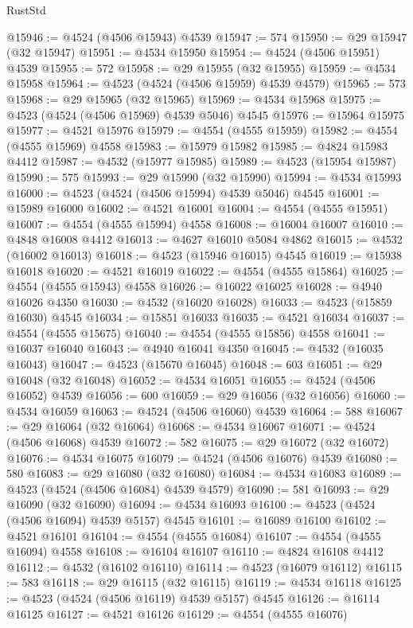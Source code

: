 \begin{lexlean}{RustStd}
\begin{coremodule}
@15946 := @4524 (@4506 @15943) @4539
@15947 := 574
@15950 := @29 @15947 (@32 @15947)
@15951 := @4534 @15950
@15954 := @4524 (@4506 @15951) @4539
@15955 := 572
@15958 := @29 @15955 (@32 @15955)
@15959 := @4534 @15958
@15964 := @4523 (@4524 (@4506 @15959) @4539 @4579)
@15965 := 573
@15968 := @29 @15965 (@32 @15965)
@15969 := @4534 @15968
@15975 := @4523 (@4524 (@4506 @15969) @4539 @5046) @4545
@15976 := @15964 @15975
@15977 := @4521 @15976
@15979 := @4554 (@4555 @15959)
@15982 := @4554 (@4555 @15969) @4558
@15983 := @15979 @15982
@15985 := @4824 @15983 @4412
@15987 := @4532 (@15977 @15985)
@15989 := @4523 (@15954 @15987)
@15990 := 575
@15993 := @29 @15990 (@32 @15990)
@15994 := @4534 @15993
@16000 := @4523 (@4524 (@4506 @15994) @4539 @5046) @4545
@16001 := @15989 @16000
@16002 := @4521 @16001
@16004 := @4554 (@4555 @15951)
@16007 := @4554 (@4555 @15994) @4558
@16008 := @16004 @16007
@16010 := @4848 @16008 @4412
@16013 := @4627 @16010 @5084 @4862
@16015 := @4532 (@16002 @16013)
@16018 := @4523 (@15946 @16015) @4545
@16019 := @15938 @16018
@16020 := @4521 @16019
@16022 := @4554 (@4555 @15864)
@16025 := @4554 (@4555 @15943) @4558
@16026 := @16022 @16025
@16028 := @4940 @16026 @4350
@16030 := @4532 (@16020 @16028)
@16033 := @4523 (@15859 @16030) @4545
@16034 := @15851 @16033
@16035 := @4521 @16034
@16037 := @4554 (@4555 @15675)
@16040 := @4554 (@4555 @15856) @4558
@16041 := @16037 @16040
@16043 := @4940 @16041 @4350
@16045 := @4532 (@16035 @16043)
@16047 := @4523 (@15670 @16045)
@16048 := 603
@16051 := @29 @16048 (@32 @16048)
@16052 := @4534 @16051
@16055 := @4524 (@4506 @16052) @4539
@16056 := 600
@16059 := @29 @16056 (@32 @16056)
@16060 := @4534 @16059
@16063 := @4524 (@4506 @16060) @4539
@16064 := 588
@16067 := @29 @16064 (@32 @16064)
@16068 := @4534 @16067
@16071 := @4524 (@4506 @16068) @4539
@16072 := 582
@16075 := @29 @16072 (@32 @16072)
@16076 := @4534 @16075
@16079 := @4524 (@4506 @16076) @4539
@16080 := 580
@16083 := @29 @16080 (@32 @16080)
@16084 := @4534 @16083
@16089 := @4523 (@4524 (@4506 @16084) @4539 @4579)
@16090 := 581
@16093 := @29 @16090 (@32 @16090)
@16094 := @4534 @16093
@16100 := @4523 (@4524 (@4506 @16094) @4539 @5157) @4545
@16101 := @16089 @16100
@16102 := @4521 @16101
@16104 := @4554 (@4555 @16084)
@16107 := @4554 (@4555 @16094) @4558
@16108 := @16104 @16107
@16110 := @4824 @16108 @4412
@16112 := @4532 (@16102 @16110)
@16114 := @4523 (@16079 @16112)
@16115 := 583
@16118 := @29 @16115 (@32 @16115)
@16119 := @4534 @16118
@16125 := @4523 (@4524 (@4506 @16119) @4539 @5157) @4545
@16126 := @16114 @16125
@16127 := @4521 @16126
@16129 := @4554 (@4555 @16076)

\end{coremodule}
\end{lexlean}

